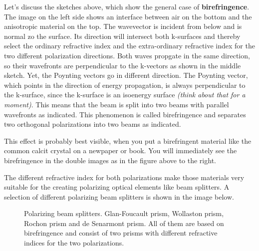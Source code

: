 \documentclass[
  a4paper,
]{book}
\begin{document}
Let's discuss the sketches above, which show the general case of
\textbf{birefringence}. The image on the left side shows an interface
between air on the bottom and the anisotropic material on the top. The
wavevector is incident from below and is normal zo the surface. Its
direction will intersect both k-surfaces and thereby select the ordinary
refractive index and the extra-ordinary refractive index for the two
different polarization directions. Both waves propgate in the same
direction, so their wavefronts are perpendicular to the k-vectors as
shown in the middle sketch. Yet, the Poynting vectors go in different
direction. The Poynting vector, which points in the direction of energy
propagation, is always perpendicular to the k-surface, since the
k-surface is an isoenergy surface \emph{(think about that for a
moment)}. This means that the beam is split into two beams with parallel
wavefronts as indicated. This phenomenon is called birefringence and
separates two orthogonal polarizations into two beams as indicated.

This effect is probably best visible, when you put a birefringent
material like the common calcit crystal on a newpaper or book. You will
immediately see the birefringence in the double images as in the figure
above to the right.

The different refractive index for both polarizations make those
materials very suitable for the creating polarizing optical elements
like beam splitters. A selection of different polarizing beam splitters
is shown in the image below.

\begin{figure}


\caption{\label{fig-polarizers}Polarizing beam splitters. Glan-Foucault
prism, Wollaston prism, Rochon prism and de Senarmont prism. All of them
are based on birefringence and consist of two prisms with different
refractive indices for the two polarizations.}

\end{figure}%
\end{document}
